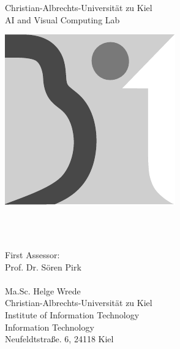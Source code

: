 
\begin{titlepage}

  \begin{center}    
      \LARGE Christian-Albrechts-Universität zu Kiel\\
      \vspace{0.2cm}
      \large AI and Visual Computing Lab\\ 
    \begin{LARGE}
    \vspace*{2.5cm}
    \includegraphics[width=.3\linewidth]{Images/Basic/BitLogo_sw.pdf}

    \vspace*{2.5cm}
    \doublespacing
    \bitType\\
    \vspace*{0.3cm}
    {\sffamily\bfseries\bitTitle}
    \singlespacing
    \end{LARGE}
    \vspace{-0.25cm}
    {\LARGE \bitAuthor}\\[1.5cm]
    \vfill
    {First Assessor:}\\[0.1cm] 
    {Prof. Dr. Sören Pirk}\\[0.1cm]
    {\bitZweitbetreuer}\\[0.1cm]
    {Ma.Sc. Helge Wrede}\\[0.5cm] 
    {\small Christian-Albrechts-Universität zu Kiel\\
			Institute of Information Technology\\
			Information Technology\\
		  	Neufeldtstraße. 6, 24118 Kiel
	}\\[0.5cm]
			
	{\bitDeadline}
  \end{center}
\end{titlepage} 
